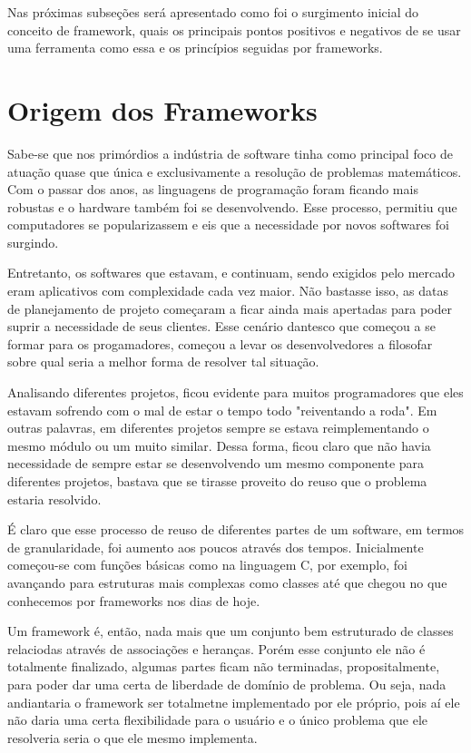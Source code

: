 \documentclass[
    12pt,       %
    openright,      %
    twoside,      %
    a4paper,      %
    english,      %
    french,       %
    spanish,      %
    brazil,       %
    ]{abntex2}
\begin{document}
      Nas próximas subseções será apresentado como foi o surgimento inicial
      do conceito de framework, quais os principais pontos positivos e
      negativos de se usar uma ferramenta como essa e os princípios
      seguidas por frameworks.

      \section{Origem dos Frameworks}
          Sabe-se que nos primórdios a indústria de software tinha como principal
          foco de atuação quase que única e exclusivamente a resolução de problemas
          matemáticos. Com o passar dos anos, as linguagens de programação
          foram ficando mais robustas e o hardware também foi se desenvolvendo. Esse
          processo, permitiu que computadores se popularizassem e eis que a necessidade
          por novos softwares foi surgindo.

          Entretanto, os softwares que estavam, e continuam, sendo exigidos pelo
          mercado eram aplicativos com complexidade cada vez maior. Não bastasse isso,
          as datas de planejamento de projeto começaram a ficar ainda mais apertadas
          para poder suprir a necessidade de seus clientes. Esse cenário dantesco
          que começou a se formar para os progamadores, começou a levar os desenvolvedores
          a filosofar sobre qual seria a melhor forma de resolver tal situação.

          Analisando diferentes projetos, ficou evidente para muitos programadores
          que eles estavam sofrendo com o mal de estar o tempo todo "reiventando
          a roda". Em outras palavras, em diferentes projetos sempre se estava
          reimplementando o mesmo módulo ou um muito similar. Dessa forma, ficou
          claro que não havia necessidade de sempre estar se desenvolvendo um mesmo
          componente para diferentes projetos, bastava que se tirasse proveito do reuso
          que o problema estaria resolvido.

          É claro que esse processo de reuso de diferentes partes de um software,
          em termos de granularidade, foi aumento aos poucos através dos tempos.
          Inicialmente começou-se com funções básicas como na linguagem C, por exemplo,
          foi avançando para estruturas mais complexas como classes até que chegou
          no que conhecemos por frameworks nos dias de hoje.

          Um framework é, então, nada mais que um conjunto bem estruturado de classes
          relaciodas através de associações e heranças. Porém esse conjunto ele não
          é totalmente finalizado, algumas partes ficam não terminadas, propositalmente,
          para poder dar uma certa de liberdade de domínio de problema. Ou seja, nada
          andiantaria o framework ser totalmetne implementado por ele próprio, pois
          aí ele não daria uma certa flexibilidade para o usuário e o único problema
          que ele resolveria seria o que ele mesmo implementa.
\end{document}
